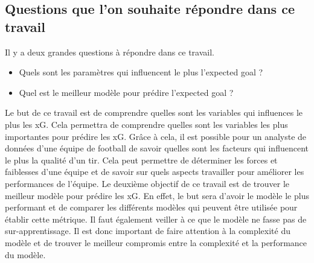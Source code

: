 \documentclass[12pt]{article}
\begin{document}
\subsection{Questions que l'on souhaite répondre dans ce travail}
\noindent Il y a deux grandes questions à répondre dans ce travail.
\begin{itemize}
    \item Quels sont les paramètres qui influencent le plus l'expected goal ?
    \item Quel est le meilleur modèle pour prédire l'expected goal ?
\end{itemize}

\noindent Le but de ce travail est de comprendre quelles sont les variables qui influences le plus les xG.
Cela permettra de comprendre quelles sont les variables les plus importantes pour prédire les xG.
Grâce à cela, il est possible pour un analyste de données d'une équipe de football de savoir quelles sont les facteurs qui influencent le plus la qualité d'un tir.
Cela peut permettre de déterminer les forces et faiblesses d'une équipe et de savoir sur quels aspects travailler pour améliorer les performances de l'équipe.
\newline \newline
\noindent Le deuxième objectif de ce travail est de trouver le meilleur modèle pour prédire les xG.
En effet, le but sera d'avoir le modèle le plus performant et de comparer les différents modèles qui peuvent être utilisée pour établir cette métrique.
Il faut également veiller à ce que le modèle ne fasse pas de sur-apprentissage. Il est donc important de faire attention à la complexité du modèle et de trouver le meilleur compromis entre la complexité et la performance du modèle.

\newpage
\end{document}
